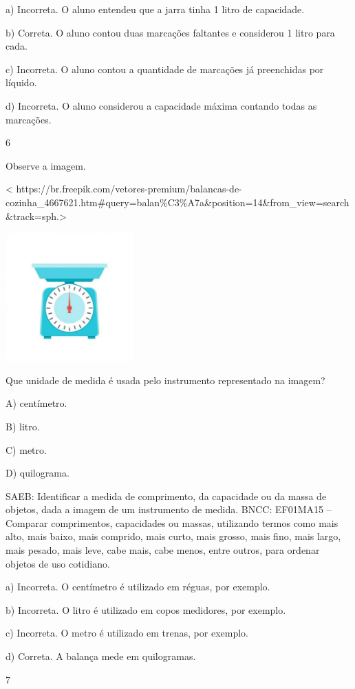 a) Incorreta. O aluno entendeu que a jarra tinha 1 litro de capacidade.

b) Correta. O aluno contou duas marcações faltantes e considerou 1
litro para cada.

c) Incorreta. O aluno contou a quantidade de marcações já preenchidas
por líquido.

d) Incorreta. O aluno considerou a capacidade máxima contando todas as marcações.

\num{6}

Observe a imagem.

\textless{}
https://br.freepik.com/vetores-premium/balancas-de-cozinha\_4667621.htm\#query=balan\%C3\%A7a\&position=14\&from\_view=search\&track=sph.\textgreater{}

\includegraphics[width=1.93750in,height=1.93750in]{media/image114.jpg}

Que unidade de medida é usada pelo instrumento representado na imagem?

A) centímetro.

B) litro.

C) metro.

D) quilograma.

SAEB: Identificar a medida de comprimento, da capacidade ou da
massa de objetos, dada a imagem de um instrumento de medida.
BNCC: EF01MA15 -- Comparar comprimentos, capacidades ou massas,
utilizando termos como mais alto, mais baixo, mais comprido, mais curto,
mais grosso, mais fino, mais largo, mais pesado, mais leve, cabe mais,
cabe menos, entre outros, para ordenar objetos de uso cotidiano.

a) Incorreta. O centímetro é utilizado em réguas, por exemplo.

b) Incorreta. O litro é utilizado em copos medidores, por exemplo.

c) Incorreta. O metro é utilizado em trenas, por exemplo.

d) Correta. A balança mede em quilogramas.

\num{7}

